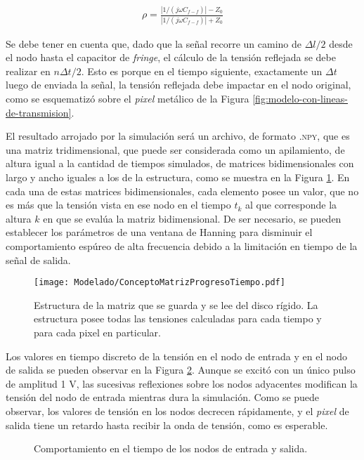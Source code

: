 \begin{align}
	\rho =   \frac{|1/(j\omega C_{f-f})| - Z_0}{|1/(j\omega C_{f-f})| + Z_0}
\end{align}

Se debe tener en cuenta que, dado que la señal recorre un camino de $\Delta l / 2$ desde el nodo hasta el capacitor de \textit{fringe}, el cálculo de la tensión reflejada se debe realizar en $n\Delta t/2$. Esto es porque en el tiempo siguiente, exactamente un $\Delta t$ luego de enviada la señal, la tensión reflejada debe impactar en el nodo original, como se esquematizó sobre el \textit{pixel} metálico de la Figura \ref{fig:modelo-con-lineas-de-transmision}.

El resultado arrojado por la simulación será un archivo, de formato \textsc{.npy}, que es una matriz tridimensional, que puede ser considerada como un apilamiento, de altura igual a la cantidad de tiempos simulados, de matrices bidimensionales con largo y ancho iguales a los de la estructura, como se muestra en la Figura \ref{fig:EstructuraTiemposMatrizNumpy}. En cada una de estas matrices bidimensionales, cada elemento posee un valor, que no es más que la tensión vista en ese nodo en el tiempo $t_k$ al que corresponde la altura $k$ en que se evalúa la matriz bidimensional. De ser necesario, se pueden establecer los parámetros de una ventana de Hanning para disminuir el comportamiento espúreo de alta frecuencia debido a la limitación en tiempo de la señal de salida.

\begin{figure}[h]
	\centering
	\texttt{[image: Modelado/ConceptoMatrizProgresoTiempo.pdf]}
	\caption{Estructura de la matriz que se guarda y se lee del disco rígido. La estructura posee todas las tensiones calculadas para cada tiempo y para cada pixel en particular.}
	\label{fig:EstructuraTiemposMatrizNumpy}
\end{figure}

Los valores en tiempo discreto de la tensión en el nodo de entrada y en el nodo de salida se pueden observar en la Figura \ref{fig:tlm_tiempo}. Aunque se excitó con un único pulso de amplitud 1 V, las sucesivas reflexiones sobre los nodos adyacentes modifican la tensión del nodo de entrada mientras dura la simulación. Como se puede observar, los valores de tensión en los nodos decrecen rápidamente, y el \textit{pixel} de salida tiene un retardo hasta recibir la onda de tensión, como es esperable.


\begin{figure}[htp]
	\centering 
	\hspace{0pt}
	\caption{Comportamiento en el tiempo de los nodos de entrada y salida.}
	\label{fig:tlm_tiempo}
\end{figure}



